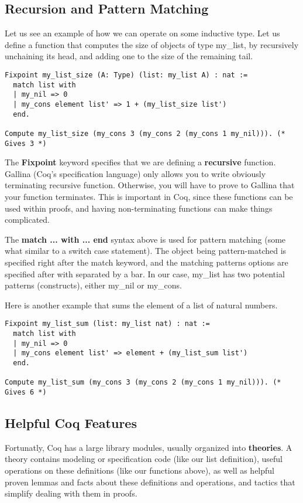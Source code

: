 \documentclass{article}
\begin{document}
\subsection{Recursion and Pattern Matching}
Let us see an example of how we can operate on some inductive type. Let us define a function
that computes the size of objects of type my\_list, by recursively unchaining its head, and adding
one to the size of the remaining tail.
\begin{verbatim}
Fixpoint my_list_size (A: Type) (list: my_list A) : nat :=
  match list with
  | my_nil => 0
  | my_cons element list' => 1 + (my_list_size list')
  end.
  
Compute my_list_size (my_cons 3 (my_cons 2 (my_cons 1 my_nil))). (* Gives 3 *)
\end{verbatim}
The \textbf{Fixpoint} keyword specifies that we are defining a \textbf{recursive} function. Gallina (Coq's specification language)
only allows you to write obviously terminating recursive function. Otherwise, you will have to prove to Gallina that your function
terminates. This is important in Coq, since these functions can be used within proofs, and having non-terminating functions
can make things complicated.

The \textbf{match ... with ... end} syntax above is used for pattern matching (some what similar to a switch case statement).
The object being pattern-matched is specified right after the match keyword, and the matching patterns options are specified
after with separated by a bar. In our case, my\_list has two potential patterns (constructs), either my\_nil or my\_cons.

Here is another example that sums the element of a list of natural numbers.
\begin{verbatim}
Fixpoint my_list_sum (list: my_list nat) : nat :=
  match list with
  | my_nil => 0
  | my_cons element list' => element + (my_list_sum list')
  end.
  
Compute my_list_sum (my_cons 3 (my_cons 2 (my_cons 1 my_nil))). (* Gives 6 *)
\end{verbatim}

\subsection{Helpful Coq Features}
Fortunatly, Coq has a large library modules, usually organized into \textbf{theories}. A theory contains modeling or specification code
(like our list definition), useful operations on these definitions (like our functions above), as well as helpful proven lemmas and facts
about these definitions and operations, and tactics that simplify dealing with them in proofs.
\end{document}
